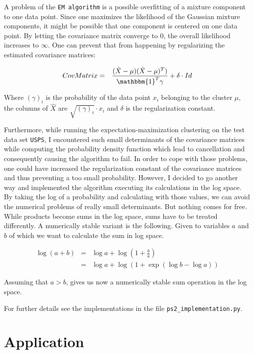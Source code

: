 \documentclass[a4paper, 12pt, titlepage]{article}
\begin{document}
A problem of the \texttt{EM algorithm} is a possible overfitting of a mixture component to one data point.
Since one maximizes the likelihood of the Gaussian mixture components, it might be possible that one component is centered on one data point.
By letting the covariance matrix converge to $0$, the overall likelihood increases to $\infty$.
One can prevent that from happening by regularizing the estimated covariance matrices:

\begin{eqnarray*}
	CovMatrix &=& \frac{(\hat X-\mu)(\hat X-\mu)^T)}{\mathbbm{1}^T\gamma} + \delta\cdot Id
\end{eqnarray*}

Where $(\gamma)_i$ is the probability of the data point $x_i$ belonging to the cluster $\mu$, the columns of $\hat X$ are $\sqrt{(\gamma)_i}\cdot x_i$ and $\delta$ is the regularization constant.

Furthermore, while running the expectation-maximization clustering on the test data set \texttt{USPS}, I encountered such small determinants of the covariance matrices while computing the probability density function which lead to cancellation and consequently causing the algorithm to fail.
In order to cope with those problems, one could have increased the regularization constant of the covariance matrices and thus preventing a too small probability.
However, I decided to go another way and implemented the algorithm executing its calculations in the log space.
By taking the log of a probability and calculating with those values, we can avoid the numerical problems of really small determinants.
But nothing comes for free.
While products become sums in the log space, sums have to be treated differently.
A numerically stable variant is the following.
Given to variables $a$ and $b$ of which we want to calculate the sum in log space.

\begin{eqnarray*}
	\log \left( a+b \right) &=& \log a + \log \left(1+\frac{b}{a}\right)\\
	&=& \log a  + \log \left(1+ \exp\left( \log b - \log a \right) \right)
\end{eqnarray*}

Assuming that $a>b$, gives us now a numerically stable sum operation in the log space. 

For further details see the implementations in the file \texttt{ps2\_implementation.py}.

\part{Application}
\label{part:application}
\end{document}
